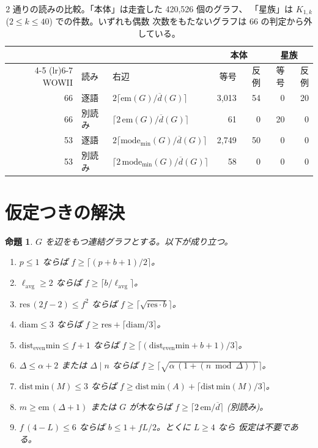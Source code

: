 \documentclass[paper=a4,fontsize=10.5pt,jafontsize=10.5pt]{jlreq}
\theoremstyle{plain}
\newtheorem{proposition}[theorem]{命題}
\theoremstyle{definition}
\begin{document}
\begin{table}[htbp]
\centering
\caption{2 通りの読みの比較。「本体」は走査した 420,526 個のグラフ、
「星族」は $K_{1,k}$ ($2 \le k \le 40$) での件数。いずれも偶数
次数をもたないグラフは 66 の判定から外している。}
\label{tab:reading}
\begin{tabular}{rllrrrr}
\toprule
& & & \multicolumn{2}{c}{本体} & \multicolumn{2}{c}{星族} \\
\cmidrule(lr){4-5} \cmidrule(lr){6-7}
WOWII & 読み & 右辺 & 等号 & 反例 & 等号 & 反例 \\
\midrule
66 & 逐語 & $2\lceil \mathrm{em}(G)/\overline{d}(G) \rceil$ & 3,013 & 54 & 0 & 20 \\
66 & 別読み & $\lceil 2\,\mathrm{em}(G)/\overline{d}(G) \rceil$ & 61 & 0 & 20 & 0 \\
53 & 逐語 & $2\lceil \mathrm{mode_{min}}(G)/\overline{d}(G) \rceil$ & 2,749 & 50 & 0 & 0 \\
53 & 別読み & $\lceil 2\,\mathrm{mode_{min}}(G)/\overline{d}(G) \rceil$ & 58 & 0 & 0 & 0 \\
\bottomrule
\end{tabular}
\end{table}

\section{仮定つきの解決}\label{sec:partial}

\begin{proposition}\label{prop:partial}
$G$ を辺をもつ連結グラフとする。以下が成り立つ。
\begin{enumerate}
\item[(40)] $p \le 1$ ならば $f \ge \lceil (p + b + 1)/2 \rceil$。
\item[(58)] $\ell_{\mathrm{avg}} \ge 2$ ならば
  $f \ge \lceil b/\ell_{\mathrm{avg}} \rceil$。
\item[(59)] $\mathrm{res}\,(2f-2) \le f^2$ ならば
  $f \ge \lceil \sqrt{\mathrm{res} \cdot b} \rceil$。
\item[(61)] $\mathrm{diam} \le 3$ ならば
  $f \ge \mathrm{res} + \lceil \mathrm{diam}/3 \rceil$。
\item[(63)] $\mathrm{dist_{even}min} \le f + 1$ ならば
  $f \ge \lceil (\mathrm{dist_{even}min} + b + 1)/3 \rceil$。
\item[(64)] $\Delta \le \alpha + 2$ または $\Delta \mid n$ ならば
  $f \ge \lceil \sqrt{\alpha\,(1 + (n \bmod \Delta))} \rceil$。
\item[(65)] $\mathrm{dist\,min}(M) \le 3$ ならば
  $f \ge \mathrm{dist\,min}(A) + \lceil \mathrm{dist\,min}(M)/3 \rceil$。
\item[(66)] $m \ge \mathrm{em}\,(\Delta + 1)$ または $G$ が木ならば
  $f \ge \lceil 2\,\mathrm{em}/\overline{d} \rceil$ (別読み)。
\item[(91)] $f\,(4 - L) \le 6$ ならば $b \le 1 + fL/2$。とくに $L \ge 4$ なら
  仮定は不要である。
\end{enumerate}
\end{proposition}
\end{document}
